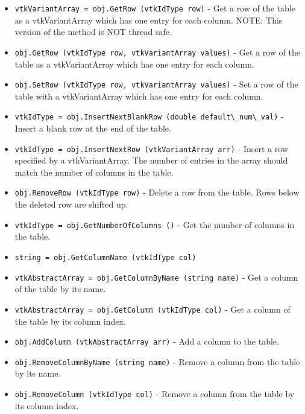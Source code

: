 \begin{itemize}
\item  \verb|vtkVariantArray = obj.GetRow (vtkIdType row)| -  Get a row of the table as a vtkVariantArray which has one entry for each column.
 NOTE: This version of the method is NOT thread safe.

\item  \verb|obj.GetRow (vtkIdType row, vtkVariantArray values)| -  Get a row of the table as a vtkVariantArray which has one entry for each column.

\item  \verb|obj.SetRow (vtkIdType row, vtkVariantArray values)| -  Set a row of the table with a vtkVariantArray which has one entry for each column.

\item  \verb|vtkIdType = obj.InsertNextBlankRow (double default\_num\_val)| -  Insert a blank row at the end of the table.

\item  \verb|vtkIdType = obj.InsertNextRow (vtkVariantArray arr)| -  Insert a row specified by a vtkVariantArray.  The number of entries in the array
 should match the number of columns in the table.

\item  \verb|obj.RemoveRow (vtkIdType row)| -  Delete a row from the table.  Rows below the deleted row are shifted up.

\item  \verb|vtkIdType = obj.GetNumberOfColumns ()| -  Get the number of columns in the table.

\item  \verb|string = obj.GetColumnName (vtkIdType col)|

\item  \verb|vtkAbstractArray = obj.GetColumnByName (string name)| -  Get a column of the table by its name.

\item  \verb|vtkAbstractArray = obj.GetColumn (vtkIdType col)| -  Get a column of the table by its column index.

\item  \verb|obj.AddColumn (vtkAbstractArray arr)| -  Add a column to the table.

\item  \verb|obj.RemoveColumnByName (string name)| -  Remove a column from the table by its name.

\item  \verb|obj.RemoveColumn (vtkIdType col)| -  Remove a column from the table by its column index.


\end{itemize}

